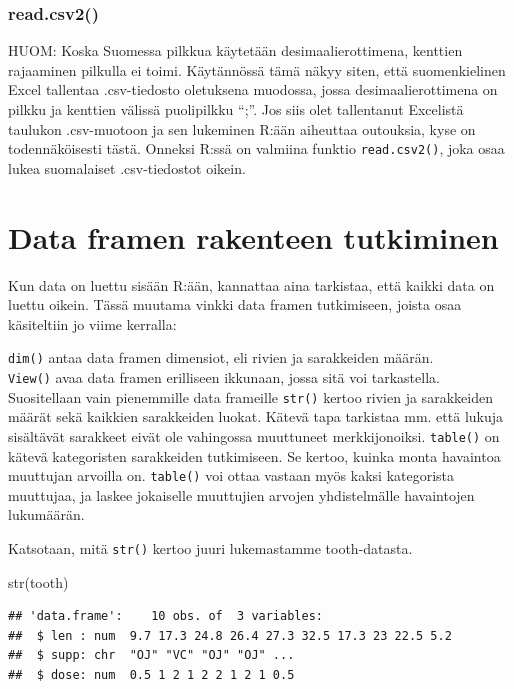 \documentclass[
]{book}
\newenvironment{Shaded}{\begin{snugshade}}{\end{snugshade}}
\newcommand{\FunctionTok}[1]{\textcolor[rgb]{0.00,0.00,0.00}{#1}}
\newcommand{\NormalTok}[1]{#1}
\begin{document}
\hypertarget{read.csv2}{%
\subsubsection{read.csv2()}\label{read.csv2}}

HUOM: Koska Suomessa pilkkua käytetään desimaalierottimena, kenttien rajaaminen pilkulla ei toimi. Käytännössä tämä näkyy siten, että suomenkielinen Excel tallentaa .csv-tiedosto oletuksena muodossa, jossa desimaalierottimena on pilkku ja kenttien välissä puolipilkku ``;''. Jos siis olet tallentanut Excelistä taulukon .csv-muotoon ja sen lukeminen R:ään aiheuttaa outouksia, kyse on todennäköisesti tästä. Onneksi R:ssä on valmiina funktio \texttt{read.csv2()}, joka osaa lukea suomalaiset .csv-tiedostot oikein.

\hypertarget{data-framen-rakenteen-tutkiminen}{%
\section{Data framen rakenteen tutkiminen}\label{data-framen-rakenteen-tutkiminen}}

Kun data on luettu sisään R:ään, kannattaa aina tarkistaa, että kaikki data on luettu oikein. Tässä muutama vinkki data framen tutkimiseen, joista osaa käsiteltiin jo viime kerralla:

\texttt{dim()} antaa data framen dimensiot, eli rivien ja sarakkeiden määrän.\\
\texttt{View()} avaa data framen erilliseen ikkunaan, jossa sitä voi tarkastella. Suositellaan vain pienemmille data frameille
\texttt{str()} kertoo rivien ja sarakkeiden määrät sekä kaikkien sarakkeiden luokat. Kätevä tapa tarkistaa mm. että lukuja sisältävät sarakkeet eivät ole vahingossa muuttuneet merkkijonoiksi.
\texttt{table()} on kätevä kategoristen sarakkeiden tutkimiseen. Se kertoo, kuinka monta havaintoa muuttujan arvoilla on. \texttt{table()} voi ottaa vastaan myös kaksi kategorista muuttujaa, ja laskee jokaiselle muuttujien arvojen yhdistelmälle havaintojen lukumäärän.

Katsotaan, mitä \texttt{str()} kertoo juuri lukemastamme tooth-datasta.

\begin{Shaded}
\begin{Highlighting}[]
\FunctionTok{str}\NormalTok{(tooth)}
\end{Highlighting}
\end{Shaded}

\begin{verbatim}
## 'data.frame':    10 obs. of  3 variables:
##  $ len : num  9.7 17.3 24.8 26.4 27.3 32.5 17.3 23 22.5 5.2
##  $ supp: chr  "OJ" "VC" "OJ" "OJ" ...
##  $ dose: num  0.5 1 2 1 2 2 1 2 1 0.5
\end{verbatim}
\end{document}
